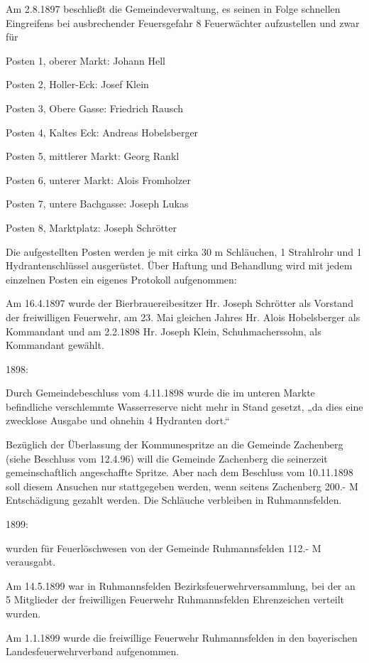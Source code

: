 \documentclass[12pt,a4pager]{book}
\begin{document}
Am 2.8.1897 beschließt die Gemeindeverwaltung, es seinen in Folge schnellen
Eingreifens bei ausbrechender Feuersgefahr 8 Feuerwächter aufzustellen und zwar
für



Posten 1, oberer Markt: Johann Hell

Posten 2, Holler-Eck: Josef Klein

Posten 3, Obere Gasse: Friedrich Rausch

Posten 4, Kaltes Eck: Andreas Hobelsberger

Posten 5, mittlerer Markt: Georg Rankl

Posten 6, unterer Markt: Alois Fromholzer

Posten 7, untere Bachgasse: Joseph Lukas

Posten 8, Marktplatz: Joseph Schrötter



Die aufgestellten Posten werden je mit cirka 30 m Schläuchen, 1 Strahlrohr und 1
Hydrantenschlüssel ausgerüstet. Über Haftung und Behandlung wird mit jedem
einzelnen Posten ein eigenes Protokoll aufgenommen:

Am 16.4.1897 wurde der Bierbrauereibesitzer Hr. Joseph Schrötter als Vorstand
der freiwilligen Feuerwehr, am 23. Mai gleichen Jahres Hr. Alois Hobelsberger
als Kommandant und am 2.2.1898 Hr. Joseph Klein, Schuhmacherssohn, als
Kommandant gewählt.

1898:

Durch Gemeindebeschluss vom 4.11.1898 wurde die im unteren Markte befindliche
verschlemmte Wasserreserve nicht mehr in Stand gesetzt, „da dies eine zwecklose
Ausgabe und ohnehin 4 Hydranten dort.“

Bezüglich der Überlassung der Kommunespritze an die Gemeinde Zachenberg (siehe
Beschluss vom 12.4.96) will die Gemeinde Zachenberg die seinerzeit
gemeinschaftlich angeschaffte Spritze. Aber nach dem Beschluss vom 10.11.1898
soll diesem Ansuchen nur stattgegeben werden, wenn seitens Zachenberg 200.- M
Entschädigung gezahlt werden. Die Schläuche verbleiben in Ruhmannsfelden.

1899:

wurden für Feuerlöschwesen von der Gemeinde Ruhmannsfelden 112.- M verausgabt.

Am 14.5.1899 war in Ruhmannsfelden Bezirksfeuerwehrversammlung, bei der an 5
Mitglieder der freiwilligen Feuerwehr Ruhmannsfelden Ehrenzeichen verteilt
wurden.

Am 1.1.1899 wurde die freiwillige Feuerwehr Ruhmannsfelden in den bayerischen
Landesfeuerwehrverband aufgenommen.
\end{document}
